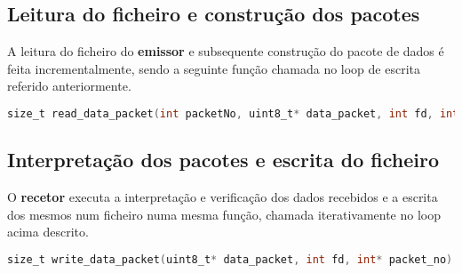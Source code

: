 \subsection{Leitura do ficheiro e construção dos pacotes}

A leitura do ficheiro do \textbf{emissor} e subsequente construção do pacote de dados é feita incrementalmente, sendo a seguinte função chamada no loop de escrita referido anteriormente.

\begin{lstlisting}[language=C, caption=Função que lê o ficheiro e constrói o pacote de dados]
    size_t read_data_packet(int packetNo, uint8_t* data_packet, int fd, int bytes_read)
\end{lstlisting}

\subsection{Interpretação dos pacotes e escrita do ficheiro}

O \textbf{recetor} executa a interpretação e verificação dos dados recebidos e a escrita dos mesmos num ficheiro numa mesma função, chamada iterativamente no loop acima descrito.

\begin{lstlisting}[language=C, caption=Função que interpreta o pacote de dados recebido e escreve no ficheiro]
    size_t write_data_packet(uint8_t* data_packet, int fd, int* packet_no)
\end{lstlisting}
